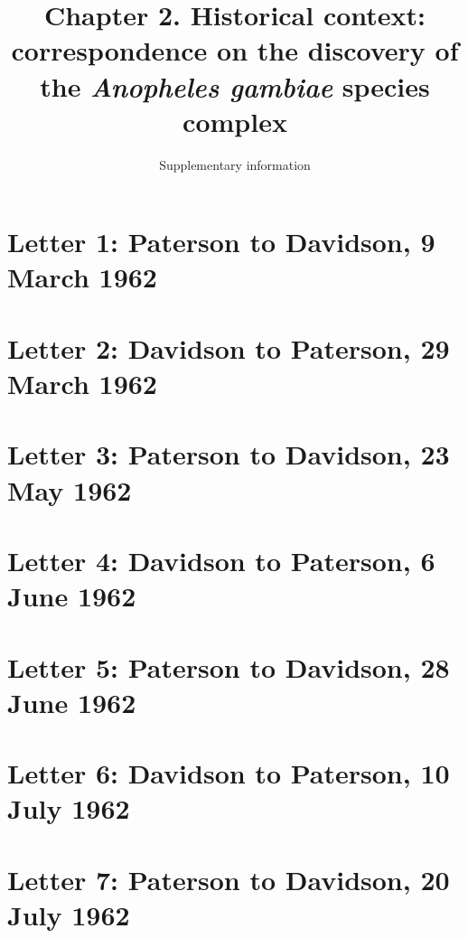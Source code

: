\documentclass[a4paper,11pt,abstracton,hidelinks]{scrartcl}
\title{
Chapter 2. Historical context: correspondence on the discovery of the \textit{Anopheles gambiae} species complex
}
\subtitle{Supplementary information}
\author{}
\begin{document}
\maketitle


\tableofcontents


\clearpage

\section{Letter 1: Paterson to Davidson, 9 March 1962}


\section{Letter 2: Davidson to Paterson, 29 March 1962}


\section{Letter 3: Paterson to Davidson, 23 May 1962}


\section{Letter 4: Davidson to Paterson, 6 June 1962}


\section{Letter 5: Paterson to Davidson, 28 June 1962}


\section{Letter 6: Davidson to Paterson, 10 July 1962}


\section{Letter 7: Paterson to Davidson, 20 July 1962}

\end{document}

